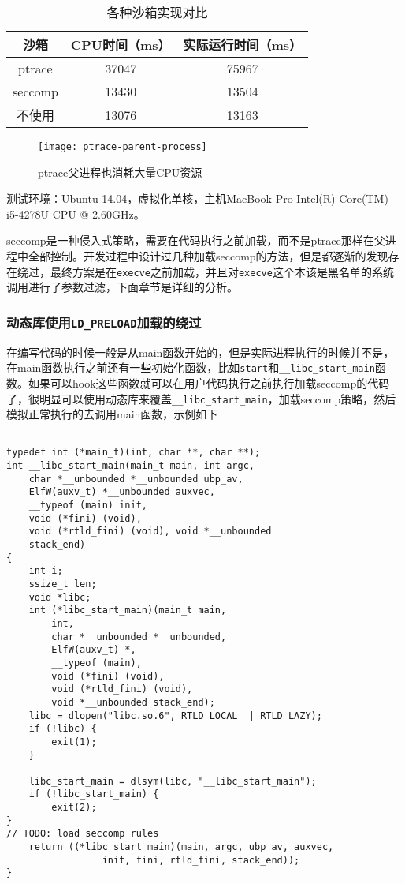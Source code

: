 \begin{table}[H]
\centering  %
\caption{各种沙箱实现对比}
\begin{tabular}{|c|c|c|}  %
\hline
沙箱 &CPU时间（ms） &实际运行时间（ms）\\ \hline  %
ptrace &37047 &75967\\         %
\hline
seccomp &13430 &13504\\        %
\hline
不使用 &13076 &13163\\ 
\hline
\end{tabular}
\end{table}

\begin{figure}[H]
\centering
\texttt{[image: ptrace-parent-process]}
\caption{ptrace父进程也消耗大量CPU资源}
\end{figure}

测试环境：Ubuntu 14.04，虚拟化单核，主机MacBook Pro Intel(R) Core(TM) i5-4278U CPU @ 2.60GHz。

seccomp是一种侵入式策略，需要在代码执行之前加载，而不是ptrace那样在父进程中全部控制。开发过程中设计过几种加载seccomp的方法，但是都逐渐的发现存在绕过，最终方案是在\texttt{execve}之前加载，并且对\texttt{execve}这个本该是黑名单的系统调用进行了参数过滤，下面章节是详细的分析。

\subsubsection{动态库使用\texttt{LD\_PRELOAD}加载的绕过}

在编写代码的时候一般是从main函数开始的，但是实际进程执行的时候并不是，在main函数执行之前还有一些初始化函数，比如\texttt{start}和\texttt{\_\_libc\_start\_main}函数\cite{linux-process-start}。如果可以hook这些函数就可以在用户代码执行之前执行加载seccomp的代码了，很明显可以使用动态库来覆盖\texttt{\_\_libc\_start\_main}，加载seccomp策略，然后模拟正常执行的去调用main函数，示例如下

\begin{verbatim}

typedef int (*main_t)(int, char **, char **);  
int __libc_start_main(main_t main, int argc, 
    char *__unbounded *__unbounded ubp_av,
    ElfW(auxv_t) *__unbounded auxvec,
    __typeof (main) init,
    void (*fini) (void),
    void (*rtld_fini) (void), void *__unbounded
    stack_end)
{
    int i;
    ssize_t len;
    void *libc;
    int (*libc_start_main)(main_t main,
        int,
        char *__unbounded *__unbounded,
        ElfW(auxv_t) *,
        __typeof (main),
        void (*fini) (void),
        void (*rtld_fini) (void),
        void *__unbounded stack_end);
    libc = dlopen("libc.so.6", RTLD_LOCAL  | RTLD_LAZY);
    if (!libc) {
        exit(1);
    }
  
    libc_start_main = dlsym(libc, "__libc_start_main");
    if (!libc_start_main) {
        exit(2);
}
// TODO: load seccomp rules
    return ((*libc_start_main)(main, argc, ubp_av, auxvec,
                 init, fini, rtld_fini, stack_end));
}

\end{verbatim}

